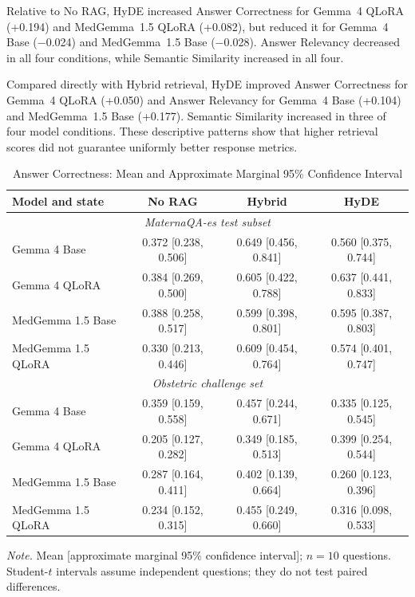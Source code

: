 Relative to No RAG, HyDE increased Answer Correctness for Gemma~4 QLoRA
(+0.194) and MedGemma~1.5 QLoRA (+0.082), but reduced it for Gemma~4 Base
($-$0.024) and MedGemma~1.5 Base ($-$0.028). Answer Relevancy decreased in
all four conditions, while Semantic Similarity increased in all four.

Compared directly with Hybrid retrieval, HyDE improved Answer Correctness
for Gemma~4 QLoRA (+0.050) and Answer Relevancy for Gemma~4 Base (+0.104)
and MedGemma~1.5 Base (+0.177). Semantic Similarity increased in three of
four model conditions. These descriptive patterns show that higher retrieval
scores did not guarantee uniformly better response metrics.

\begin{table}[t]
\footnotesize
\centering
\begin{threeparttable}
\caption{Answer Correctness: Mean and Approximate Marginal 95\% Confidence
Interval}
\label{tab:correctness-ci}
\begin{tabular*}{\textwidth}{@{\extracolsep{\fill}}lccc@{}}
\toprule
\textbf{Model and state} & \textbf{No RAG} & \textbf{Hybrid} & \textbf{HyDE} \\
\midrule
\multicolumn{4}{c}{\textit{MaternaQA-es test subset}} \\
\midrule
Gemma 4 Base        & 0.372 [0.238, 0.506] & 0.649 [0.456, 0.841] & 0.560 [0.375, 0.744] \\
Gemma 4 QLoRA       & 0.384 [0.269, 0.500] & 0.605 [0.422, 0.788] & 0.637 [0.441, 0.833] \\
MedGemma 1.5 Base   & 0.388 [0.258, 0.517] & 0.599 [0.398, 0.801] & 0.595 [0.387, 0.803] \\
MedGemma 1.5 QLoRA  & 0.330 [0.213, 0.446] & 0.609 [0.454, 0.764] & 0.574 [0.401, 0.747] \\
\midrule
\multicolumn{4}{c}{\textit{Obstetric challenge set}} \\
\midrule
Gemma 4 Base        & 0.359 [0.159, 0.558] & 0.457 [0.244, 0.671] & 0.335 [0.125, 0.545] \\
Gemma 4 QLoRA       & 0.205 [0.127, 0.282] & 0.349 [0.185, 0.513] & 0.399 [0.254, 0.544] \\
MedGemma 1.5 Base   & 0.287 [0.164, 0.411] & 0.402 [0.139, 0.664] & 0.260 [0.123, 0.396] \\
MedGemma 1.5 QLoRA  & 0.234 [0.152, 0.315] & 0.455 [0.249, 0.660] & 0.316 [0.098, 0.533] \\
\bottomrule
\end{tabular*}
\begin{tablenotes}[flushleft]
\item[] \textit{Note.} Mean [approximate marginal 95\% confidence interval];
$n = 10$ questions. Student-$t$ intervals
assume independent questions; they do not test paired differences.
\end{tablenotes}
\end{threeparttable}
\end{table}

